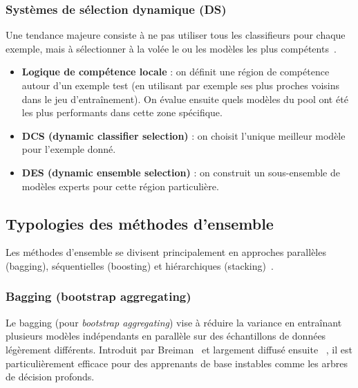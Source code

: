 \subsubsection{Systèmes de sélection dynamique (DS)}

Une tendance majeure consiste à ne pas utiliser tous les classifieurs pour chaque exemple,
mais à sélectionner \og à la volée \fg{} le ou les modèles les plus compétents~\cite{cruz_deslib_jmlr,deslib_github,ko2007_dynamic_ensemble,esann2014_des_regression,deslib_docs}.

\begin{itemize}
  \item \textbf{Logique de compétence locale} : on définit une \og région de compétence \fg{} autour d'un
  exemple test (en utilisant par exemple ses plus proches voisins dans le jeu d'entraînement).
  On évalue ensuite quels modèles du pool ont été les plus performants dans cette zone
  spécifique.

  \item \textbf{DCS (dynamic classifier selection)} : on choisit l'unique meilleur modèle pour l'exemple
  donné.

  \item \textbf{DES (dynamic ensemble selection)} : on construit un sous-ensemble de modèles
  experts pour cette région particulière.
\end{itemize}



\subsection{Typologies des méthodes d'ensemble}

Les méthodes d'ensemble se divisent principalement en approches parallèles (bagging),
séquentielles (boosting) et hiérarchiques (stacking)~\cite{mlm_bagging_vs_boosting_vs_stacking,younas_bagging_boosting_stacking,nsacademy_what_is_ensemble}.

\subsubsection{Bagging (bootstrap aggregating)}

Le bagging (pour \emph{bootstrap aggregating}) vise à réduire la variance en entraînant plusieurs
modèles indépendants en parallèle sur des échantillons de données légèrement différents.
Introduit par Breiman~\cite{breiman_bagging_1996} et largement diffusé ensuite
~\cite{ibm_bagging,greatlearning_bagging_boosting,analyticsvidhya_ensemble_learning}, il est
particulièrement efficace pour des apprenants de base instables comme les arbres de décision
profonds.

